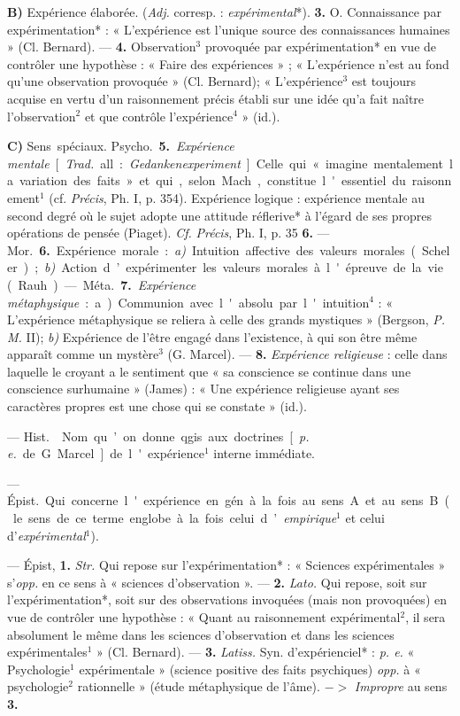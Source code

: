 \begin{itemize}[leftmargin=1cm, label=, itemsep=1pt]
{\bf B)}  Expérience élaborée. ({\it Adj.}
corresp. : {\it expérimental}*). {\bf 3.} O. Connaissance par
expérimentation* : « L'expérience est l'unique source
des connaissances humaines » (Cl. Bernard). — {\bf 4.} 
Observation$^3$ provoquée par expérimentation* en vue de contrôler une
hypothèse : « Faire des expériences » ; « L’expérience n’est au fond
qu’une observation provoquée » (Cl. Bernard);
« L'expérience$^3$ est toujours acquise en vertu d'un
raisonnement précis établi sur une idée qu’a fait naître
l'observation$^2$ et que contrôle l’expérience$^4$ » (id.).

{\bf C)} \si{Sens spéciaux}.  \si{Psycho.}
 {\bf 5.} {\it Expérience mentale} [{\it Trad.} all. :
{\it Gedankenexperiment}]. Celle qui
« imagine mentalement la variation
des faits » et qui, selon Mach, constitue l'essentiel du raisonnement$^1$
(cf.  {\it Précis}, Ph. I, p. 354). Expérience logique : expérience mentale
au second degré où le sujet adopte une attitude réflerive* à l'égard de
ses propres opérations de pensée (Piaget). {\it Cf.}  {\it Précis}, Ph. I,
p. 35 {\bf 6.} — \si{Mor.} {\bf 6.} Expérience morale : {\it a)} Intuition
affective des valeurs morales (Scheler); {\it b)} Action d’expérimenter
les valeurs morales à l'épreuve de la vie (Rauh). — \si{Méta.} {\bf 7.}
{\it Expérience métaphysique} : a) Communion
avec l'absolu par l'intuition$^4$ : « L'expérience métaphysique se
reliera à celle des grands mystiques » (Bergson, {\it P. M.} II);
{\it b)} Expérience de l’être engagé dans l'existence, à
qui son être même apparaît comme un mystère$^3$ (G. Marcel).
— {\bf 8.} {\it Expérience religieuse} : celle dans laquelle
le croyant a le sentiment que « sa conscience se continue dans une
conscience surhumaine » (James) : « Une expérience religieuse ayant ses
caractères propres est une chose qui se constate » (id.).

 — \si{Hist.}  Nom
qu’on donne qgis. aux doctrines
[{\it p. e.} de G. Marcel] de l'expérience$^1$
interne immédiate.

 — \si{Épist.}
Qui concerne l'expérience en gén. à
la fois au sens A et au sens B (le sens
de ce terme englobe à la fois celui
d’{\it empirique}$^1$ et celui d'{\it expérimental}$^1$).

 — Épist, {\bf 1.} {\it Str.} Qui
repose sur l’expérimentation* :
« Sciences expérimentales » s’{\it opp.}
en ce sens à « sciences d’observation ». — {\bf 2.} {\it Lato.} Qui repose,
soit sur l’expérimentation*, soit sur des observations invoquées (mais non
provoquées) en vue de contrôler une hypothèse : « Quant au raisonnement
expérimental$^2$, il sera absolument le même dans les sciences
d'observation et dans les sciences expérimentales$^1$ » (Cl. Bernard).
— {\bf 3.} {\it Latiss.} Syn. d'expérienciel* : {\it p. e.}
« Psychologie$^1$ expérimentale »
(science positive des faits psychiques) {\it opp.} à « psychologie$^2$ rationnelle » (étude métaphysique de l'âme).
$->$ {\it Impropre} au sens {\bf 3.}


\end{itemize}
